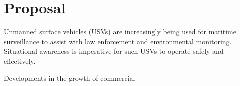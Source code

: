 \section*{Proposal}

Unmanned surface vehicles (USVs) are increasingly being used for maritime surveillance
to assist with law enforcement and environmental monitoring.
Situational awareness is imperative for such USVs to operate safely and effectively.

Developments in the growth of commercial 
